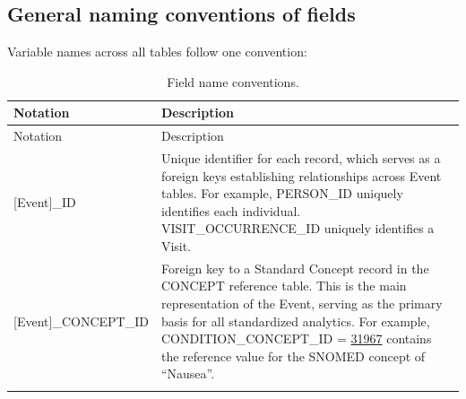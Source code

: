 \documentclass[11pt]{book}
\theoremstyle{definition}
\theoremstyle{definition}
\theoremstyle{definition}
\theoremstyle{remark}
\begin{document}
\hypertarget{general-naming-conventions-of-fields}{%
\subsection{General naming conventions of fields}\label{general-naming-conventions-of-fields}}

Variable names across all tables follow one convention:

\begin{longtable}[]{@{}ll@{}}
\caption{\label{tab:fieldConventions} Field name conventions.}\tabularnewline
\toprule
\begin{minipage}[b]{0.34\columnwidth}\raggedright
Notation\strut
\end{minipage} & \begin{minipage}[b]{0.61\columnwidth}\raggedright
Description\strut
\end{minipage}\tabularnewline
\midrule
\endfirsthead
\toprule
\begin{minipage}[b]{0.34\columnwidth}\raggedright
Notation\strut
\end{minipage} & \begin{minipage}[b]{0.61\columnwidth}\raggedright
Description\strut
\end{minipage}\tabularnewline
\midrule
\endhead
\begin{minipage}[t]{0.34\columnwidth}\raggedright
{[}Event{]}\_ID\strut
\end{minipage} & \begin{minipage}[t]{0.61\columnwidth}\raggedright
Unique identifier for each record, which serves as a foreign keys establishing relationships across Event tables. For example, PERSON\_ID uniquely identifies each individual. VISIT\_OCCURRENCE\_ID uniquely identifies a Visit.\strut
\end{minipage}\tabularnewline
\begin{minipage}[t]{0.34\columnwidth}\raggedright
{[}Event{]}\_CONCEPT\_ID\strut
\end{minipage} & \begin{minipage}[t]{0.61\columnwidth}\raggedright
Foreign key to a Standard Concept record in the CONCEPT reference table. This is the main representation of the Event, serving as the primary basis for all standardized analytics. For example, CONDITION\_CONCEPT\_ID = \href{http://athena.ohdsi.org/search-terms/terms/31967}{31967} contains the reference value for the SNOMED concept of ``Nausea''.\strut
\end{minipage}\tabularnewline
\begin{minipage}[t]{0.34\columnwidth}\raggedright

\end{minipage}
\end{longtable}
\end{document}
